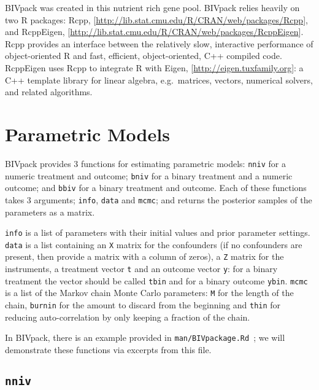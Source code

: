 \documentclass[12pt,oneside]{article}
\begin{document}
BIVpack was created in this nutrient rich gene pool.  BIVpack relies
heavily on two R packages: Rcpp,
[\url{http://lib.stat.cmu.edu/R/CRAN/web/packages/Rcpp}],
and RcppEigen,
[\url{http://lib.stat.cmu.edu/R/CRAN/web/packages/RcppEigen}].
Rcpp provides an interface between the relatively slow, interactive
performance of object-oriented R and fast, efficient, object-oriented,
C++ compiled code.  RcppEigen uses Rcpp to integrate R with
Eigen, [\url{http://eigen.tuxfamily.org}]: a C++ template library for
linear algebra, e.g.\ matrices, vectors, numerical solvers, and related
algorithms.

\section{Parametric Models}

BIVpack provides 3 functions for estimating parametric models:
\texttt{nniv} for a numeric treatment and outcome;
\texttt{bniv} for a binary treatment and a numeric outcome; and
\texttt{bbiv} for a binary treatment and outcome.  Each of these
functions takes 3 arguments; \texttt{info}, \texttt{data} and
\texttt{mcmc}; and returns the posterior samples of the parameters
as a matrix.

\texttt{info} is a list of parameters
with their initial values and prior parameter settings.
\texttt{data} is a list containing an \texttt{X} matrix for the
confounders (if no confounders are present, then provide a matrix
with a column of zeros), a \texttt{Z} matrix for the instruments, a
treatment vector \texttt{t} and an outcome vector \texttt{y}:
for a binary treatment the vector should be called \texttt{tbin}
and for a binary outcome \texttt{ybin}.  \texttt{mcmc} is a list
of the Markov chain Monte Carlo parameters:  \texttt{M} for the
length of the chain, \texttt{burnin} for the amount to discard
from the beginning and \texttt{thin} for reducing auto-correlation
by only keeping a fraction of the chain.

In BIVpack, there is an example provided in \texttt{man/BIVpackage.Rd}\ ;
we will demonstrate these functions via excerpts from this file.

\subsection{\texttt{nniv}}
\end{document}
